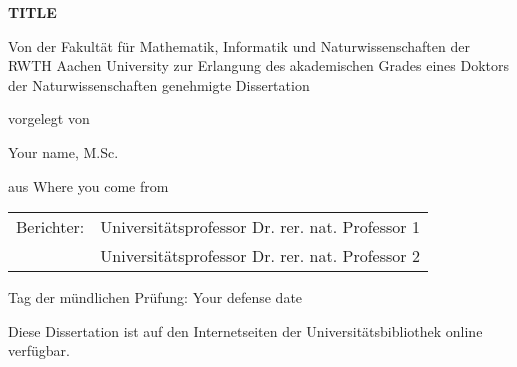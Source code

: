 \begin{titlepage}
\large
\begin{center}

\begin{doublespacing} 

\vspace*{1cm}

{\Large{\textbf{TITLE}}}


\vspace{2cm}

\begin{minipage}[b]{14cm}
\centering
Von der Fakultät für Mathematik, Informatik und Naturwissenschaften der RWTH Aachen University zur Erlangung des akademischen Grades eines Doktors der Naturwissenschaften genehmigte Dissertation
\end{minipage}

\vspace{2cm}

vorgelegt von

Your name, M.Sc.


aus Where you come from

\end{doublespacing} 
\end{center}

\pagestyle{empty}


\vspace{5cm}
\noindent
\begin{tabular}{@{}ll}
Berichter:
	& Universitätsprofessor Dr. rer. nat. Professor 1 \\
	& Universitätsprofessor Dr. rer. nat. Professor 2
\end{tabular}

\vspace*{\fill}
\noindent
Tag der m\"undlichen Pr\"ufung: Your defense date

\noindent
Diese Dissertation ist auf den Internetseiten der Universitätsbibliothek online verf\"ugbar.
\cleardoublepage
\end{titlepage}


